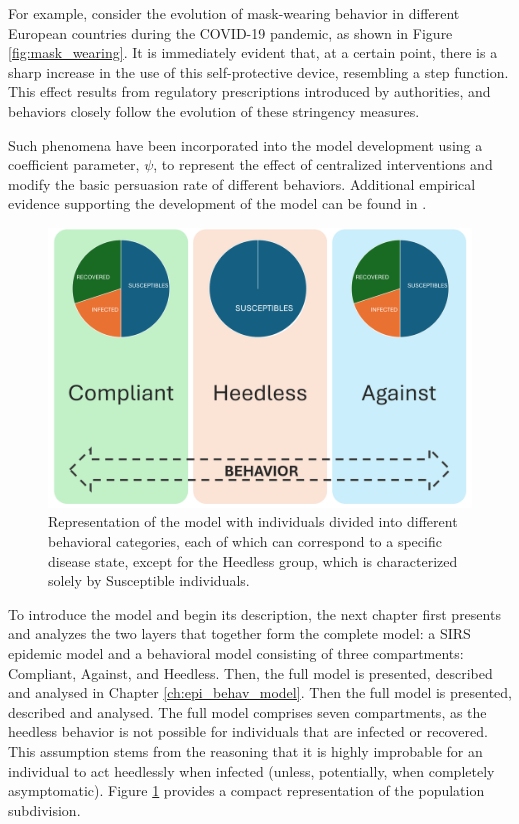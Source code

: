 For example, consider the evolution of mask-wearing behavior in different European countries during the COVID-19 pandemic, as shown in Figure \ref{fig:mask_wearing}. It is immediately evident that, at a certain point, there is a sharp increase in the use of this self-protective device, resembling a step function. This effect results from regulatory prescriptions introduced by authorities, and behaviors closely follow the evolution of these stringency measures.

Such phenomena have been incorporated into the model development using a coefficient parameter, $\psi$, to represent the effect of centralized interventions and modify the basic persuasion rate of different behaviors. Additional empirical evidence supporting the development of the model can be found in \cite{Proverbio_Tex_2024}. 

\begin{figure}[ht]
	\centering
	\includegraphics[width=0.6\linewidth]{1_corpo/figure/Model_behav_epidemic}
	\caption[Epi-behavior model]{Representation of the model with individuals divided into different behavioral categories, each of which can correspond to a specific disease state, except for the Heedless group, which is characterized solely by Susceptible individuals.}
	\label{fig:modelbehavepidemic}
\end{figure}

To introduce the model and begin its description, the next chapter first presents and analyzes the two layers that together form the complete model: a SIRS epidemic model and a behavioral model consisting of three compartments: Compliant, Against, and Heedless. Then, the full model is presented, described and analysed in Chapter \ref{ch:epi_behav_model}.
Then the full model is presented, described and analysed. 
The full model comprises seven compartments, as the heedless behavior is not possible for individuals that are infected or recovered. This assumption stems from the reasoning that it is highly improbable for an individual to act heedlessly when infected (unless, potentially, when completely asymptomatic). Figure \ref{fig:modelbehavepidemic} provides a compact representation of the population subdivision.

